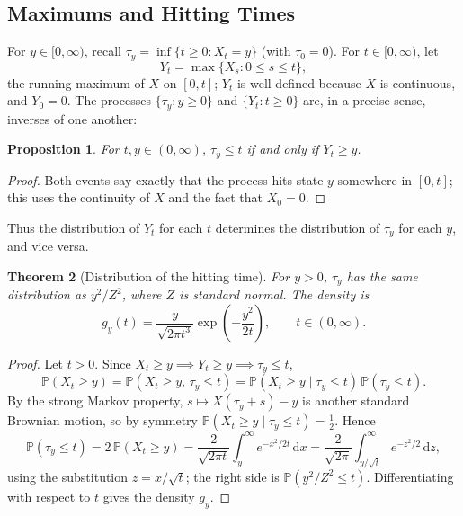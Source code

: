\documentclass[12pt,openany]{book}
\newtheorem{theorem}{Theorem}[section]
\newtheorem{proposition}[theorem]{Proposition}
\theoremstyle{definition}
\theoremstyle{remark}
\newcommand{\Prob}{\mathbb{P}}
\newcommand{\dd}{\,\mathrm{d}}
\begin{document}
\subsection{Maximums and Hitting Times}
 
For $y \in [0,\infty)$, recall $\tau_y = \inf\{t \ge 0 : X_t = y\}$ (with $\tau_0 = 0$). For $t \in [0,\infty)$, let
\[
    Y_t = \max\{X_s : 0 \le s \le t\},
\]
the running maximum of $X$ on $[0,t]$; $Y_t$ is well defined because $X$ is continuous, and $Y_0=0$. The processes $\{\tau_y : y \ge 0\}$ and $\{Y_t : t \ge 0\}$ are, in a precise sense, inverses of one another:
 
\begin{proposition}
For $t,y \in (0,\infty)$, $\tau_y \le t$ if and only if $Y_t \ge y$.
\end{proposition}
\begin{proof}
Both events say exactly that the process hits state $y$ somewhere in $[0,t]$; this uses the continuity of $X$ and the fact that $X_0=0$.
\end{proof}
 
Thus the distribution of $Y_t$ for each $t$ determines the distribution of $\tau_y$ for each $y$, and vice versa.
 
\begin{theorem}[Distribution of the hitting time]
For $y>0$, $\tau_y$ has the same distribution as $y^2/Z^2$, where $Z$ is standard normal. The density is
\begin{equation}
    g_y(t) = \frac{y}{\sqrt{2\pi t^3}} \exp\!\left(-\frac{y^2}{2t}\right), \qquad t \in (0,\infty). \tag{18.1.20}
\end{equation}
\end{theorem}
\begin{proof}
Let $t>0$. Since $X_t \ge y \implies Y_t \ge y \implies \tau_y \le t$,
\begin{equation}
    \Prob(X_t \ge y) = \Prob(X_t \ge y,\, \tau_y \le t) = \Prob(X_t \ge y \mid \tau_y \le t)\,\Prob(\tau_y \le t). \tag{18.1.21}
\end{equation}
By the strong Markov property, $s \mapsto X(\tau_y+s) - y$ is another standard Brownian motion, so by symmetry $\Prob(X_t \ge y \mid \tau_y \le t) = \tfrac12$. Hence
\begin{equation}
    \Prob(\tau_y \le t) = 2\,\Prob(X_t \ge y) = \frac{2}{\sqrt{2\pi t}} \int_y^\infty e^{-x^2/2t}\dd x = \frac{2}{\sqrt{2\pi}}\int_{y/\sqrt t}^\infty e^{-z^2/2}\dd z, \tag{18.1.22}
\end{equation}
using the substitution $z = x/\sqrt t$; the right side is $\Prob(y^2/Z^2 \le t)$. Differentiating with respect to $t$ gives the density $g_y$.
\end{proof}
 
\end{document}
